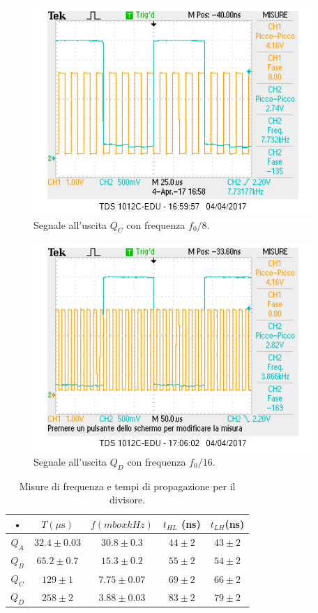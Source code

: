 \documentclass[10pt,a4paper]{article}
\begin{document}
\begin{figure}
\centering
\includegraphics[scale=1.0]{QC1-8.png}
\caption{Segnale all'uscita $Q_C$ con frequenza $f_0/8$.\label{freq8}}
\end{figure}

\begin{figure}
\centering
\includegraphics[scale=1.0]{QD1-16.png}
\caption{Segnale all'uscita $Q_D$ con frequenza $f_0/16$.\label{freq16}}
\end{figure}


\begin{table}[!htb]
\centering
\begin{tabular}{|c|c|c|c|c|}
\hline 
• & $T (\mu \mbox{s})$ & $f (mbox{kHz})$ & $t_{HL}$ (ns) & $t_{LH}$(ns) \\ 
\hline 
$Q_A$ & $32.4 \pm 0.03$ & $30.8 \pm 0.3$ & $44 \pm 2$ & $43 \pm 2$ \\ 
\hline 
$Q_B$ & $65.2 \pm 0.7$ & $15.3 \pm 0.2$ & $55 \pm 2$ & $54 \pm 2$ \\ 
\hline 
$Q_C$ & $129 \pm 1$ & $7.75 \pm 0.07$ & $69 \pm 2$ & $66 \pm 2$ \\ 
\hline 
$Q_D$ & $258 \pm 2$ & $3.88 \pm 0.03$ & $83 \pm 2$ & $79 \pm 2$ \\ 
\hline 
\end{tabular} 
\caption{Misure di frequenza e tempi di propagazione per il divisore. \label{misureDivisore}}
\end{table}
\end{document}
